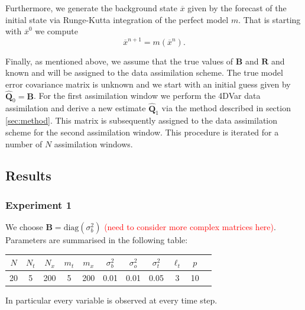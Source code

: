 \documentclass[a4paper,10pt]{article}
\numberwithin{equation}{section}
\begin{document}
Furthermore, we generate the background state $\overline x$ given by the forecast of the initial state via Runge-Kutta integration of the perfect model $m$. That is starting with $\overline x^0$ we compute 
\begin{equation}
\overline x^{n+1}=m(\overline x^n).
\end{equation}

Finally, as mentioned above, we assume that the true values of  ${\mathbf B}$ and ${\mathbf R}$ and known and will be assigned to the data assimilation scheme. The true model error covariance matrix is unknown and we start with an initial guess given by $\hat{\mathbf Q}_0=\mathbf B$. For the first assimilation window we perform the 4DVar data assimilation and derive a new estimate $\hat{\mathbf Q}_1$ via the method described in section \ref{sec:method}. This matrix is subsequently assigned to the data assimilation scheme for the second assimilation window. This procedure is iterated for a number of $N$ assimilation windows. 

\newpage
\subsection{Results}

\subsubsection*{Experiment 1}
We choose  ${\mathbf B}=\text{diag}(\sigma_b^2)$ \textcolor{red}{(need to consider more complex matrices here)}. Parameters are summarised in the following table: 
\begin{table}[H]
\begin{center}
\begin{tabular}{ |c|c|c|c|c|c|c|c|c|c|c|} 
 \hline
$ N$& $N_t$& $N_x$&$m_t$&$m_x$&$\sigma_b^2$&$\sigma_o^2$&$\sigma_t^2$&$\ell_t$&$p$\\ 
 \hline
20 &     5& 200&  5 & 200&0.01&0.01&0.05&3&10 \\
\hline
\end{tabular}
\end{center}
\end{table}
In particular every variable is observed at every time step. 
\end{document}
